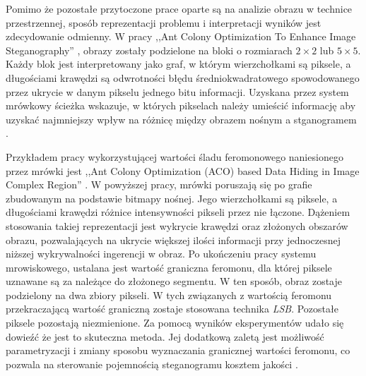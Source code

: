{{{            %
            Pomimo że pozostałe przytoczone prace oparte są na analizie obrazu w technice przestrzennej, sposób
            reprezentacji problemu i interpretacji wyników jest zdecydowanie odmienny. W pracy ,,Ant Colony
            Optimization To Enhance Image Steganography'' \cite{ZghaerACOStegEN}, obrazy zostały podzielone na bloki o
            rozmiarach $2 \times 2$ lub $5 \times 5$. Każdy blok jest interpretowany jako graf, w którym wierzchołkami
            są piksele, a długościami krawędzi są odwrotności błędu średniokwadratowego spowodowanego przez ukrycie w
            danym pikselu jednego bitu informacji. Uzyskana przez system mrówkowy ścieżka wskazuje, w których pikselach
            należy umieścić informację aby uzyskać najmniejszy wpływ na różnicę między obrazem nośnym a
            stganogramem \cite{ZghaerACOStegEN}.

            Przykładem pracy wykorzystującej wartości śladu feromonowego naniesionego przez mrówki jest ,,Ant Colony
            Optimization (ACO) based Data Hiding in Image Complex Region'' \cite{Khan2018AntCO}. W powyższej pracy,
            mrówki poruszają się po grafie zbudowanym na podstawie bitmapy nośnej. Jego wierzchołkami są piksele, a
            długościami krawędzi różnice intensywności pikseli przez nie łączone. Dążeniem stosowania takiej
            reprezentacji jest wykrycie krawędzi oraz złożonych obszarów obrazu, pozwalających na ukrycie większej
            ilości informacji przy jednoczesnej niższej wykrywalności ingerencji w obraz. Po ukończeniu pracy systemu
            mrowiskowego, ustalana jest wartość graniczna feromonu, dla której piksele uznawane są za należące do
            złożonego segmentu. W ten sposób, obraz zostaje podzielony na dwa zbiory pikseli. W tych związanych z
            wartością feromonu przekraczającą wartość graniczną zostaje stosowana technika \textit{LSB}. Pozostałe
            piksele pozostają niezmienione. Za pomocą wyników eksperymentów udało się dowieźć że jest to skuteczna
            metoda. Jej dodatkową zaletą jest możliwość parametryzacji i zmiany sposobu wyznaczania granicznej wartości
            feromonu, co pozwala na sterowanie pojemnością steganogramu kosztem jakości \cite{Khan2018AntCO}.
        }
    }

}

